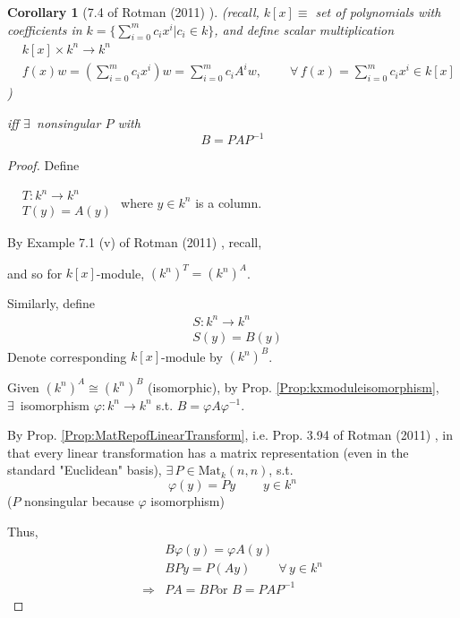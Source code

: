 \documentclass[10pt]{amsart}
\newtheorem{corollary}{Corollary}
\begin{document}
\begin{multicols*}{2}
\begin{corollary}[7.4 of Rotman (2011) \cite{JRotman2010}]
	(recall, $k[x]\equiv $ set of polynomials with coefficients in $k = \lbrace \sum_{i=0}^m c_ix^i | c_i \in k \rbrace$, and define scalar multiplication 
	\[
	\begin{aligned}
		& k[x] \times k^n \to k^n \\
		& f(x) w = \left( \sum_{i=0}^m c_i x^i \right) w = \sum_{i=0}^m c_iA^i w, \qquad \  \forall \, f(x) = \sum_{i=0}^m c_i x^i \in k[x] 
	\end{aligned}
	\]
	)
	
	iff $\exists \, $ nonsingular $P$ with 
	\[
	B=PAP^{-1}
	\]
	
	\end{corollary}

\begin{proof}
	Define 
	
	$\begin{aligned} & T:k^n \to k^n \\
	& T(y) = A(y) \end{aligned}$
where $y\in k^n $ is a column.  

By Example 7.1 (v) of Rotman (2011)  \cite{JRotman2010}, recall, 

and so for $k[x]$-module, $(k^n)^T = (k^n)^A$.  

Similarly, define 
\[
\begin{aligned} 
	& S: k^n \to k^n  \\
	& S(y) = B(y) 
	\end{aligned}
	\]
	Denote corresponding $k[x]$-module by $(k^n)^B$.  
	
	Given $(k^n)^A \cong (k^n)^B$ (isomorphic), by Prop. \ref{Prop:kxmoduleisomorphism}, \\
	$\exists \, $ isomorphism $\varphi :k^n \to k^n$ s.t. $B=\varphi A \varphi^{-1}$.  

By Prop. \ref{Prop:MatRepofLinearTransform}, i.e. Prop. 3.94 of Rotman (2011)  \cite{JRotman2010}, in that every linear transformation has a matrix representation (even in the standard "Euclidean" basis), $\exists \,  P \in \text{Mat}_{k}(n,n)$, s.t. 
\[
\varphi(y) = Py \qquad \  y\in k^n
\]
($P$ nonsingular because $\varphi$ isomorphism)

Thus, 
\[
\begin{aligned}
& B\varphi(y) = \varphi A(y)  \\ 
& BPy = P(Ay) \qquad \  \forall \, y \in k^n  \\
\Longrightarrow & PA = BP \text{or } B= PAP^{-1}
\end{aligned}
\]


\end{proof}
\end{multicols*}
\end{document}
